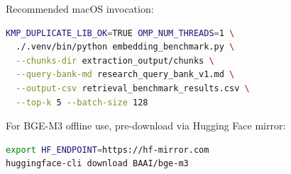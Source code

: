 Recommended macOS invocation:
\begin{lstlisting}[language=bash,caption={Embedding benchmark execution command.}]
KMP_DUPLICATE_LIB_OK=TRUE OMP_NUM_THREADS=1 \
  ./.venv/bin/python embedding_benchmark.py \
  --chunks-dir extraction_output/chunks \
  --query-bank-md research_query_bank_v1.md \
  --output-csv retrieval_benchmark_results.csv \
  --top-k 5 --batch-size 128
\end{lstlisting}

For BGE-M3 offline use, pre-download via Hugging Face mirror:
\begin{lstlisting}[language=bash,caption={Offline BGE-M3 model download.}]
export HF_ENDPOINT=https://hf-mirror.com
huggingface-cli download BAAI/bge-m3
\end{lstlisting}
